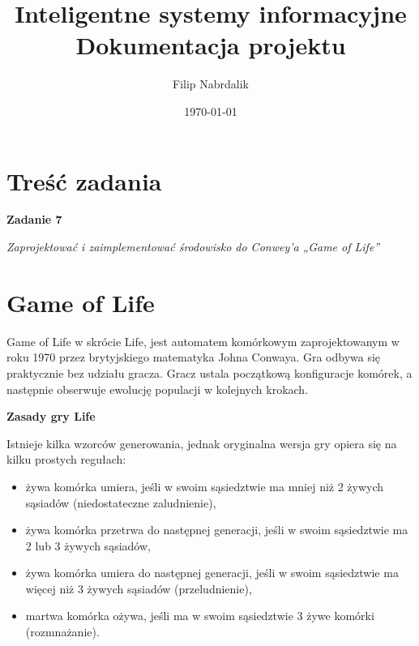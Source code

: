 \documentclass[a4paper, 10pt]{article}
\title{{\bf {Inteligentne systemy informacyjne }} \\ {\large Dokumentacja projektu}}
\date{\today}
\author{Filip Nabrdalik}
\begin{document}

\null  %
\nointerlineskip  %
\vfill
\let\snewpage \newpage
\let\newpage \relax
\maketitle %
\let \newpage \snewpage
\vfill
\break %



\tableofcontents

\newpage






\section{Treść zadania}

{\bf{Zadanie 7}}

{\it Zaprojektować i zaimplementować środowisko do Conwey’a „Game of Life”}


\section{Game of Life}

Game of Life \cite{gol} w skrócie Life, jest automatem komórkowym zaprojektowanym w roku 1970 przez brytyjskiego matematyka Johna Conwaya.
Gra odbywa się praktycznie bez udziału gracza. Gracz ustala początkową konfiguracje komórek, a następnie obserwuje ewolucję
populacji w kolejnych krokach.

 {\bf{Zasady gry Life }}

Istnieje kilka wzorców generowania, jednak oryginalna wersja
gry opiera się na kilku prostych regułach:

\begin{itemize}
  \item żywa komórka umiera, jeśli w swoim sąsiedztwie ma mniej niż 2 żywych sąsiadów (niedostateczne zaludnienie),
  \item żywa komórka przetrwa do następnej generacji, jeśli w swoim sąsiedztwie ma 2 lub 3 żywych sąsiadów,
  \item żywa komórka umiera do następnej generacji, jeśli w swoim sąsiedztwie ma więcej niż 3 żywych sąsiadów (przeludnienie),
  \item martwa komórka ożywa, jeśli ma w swoim sąsiedztwie 3 żywe komórki (rozmnażanie).
\end{itemize}
\end{document}
